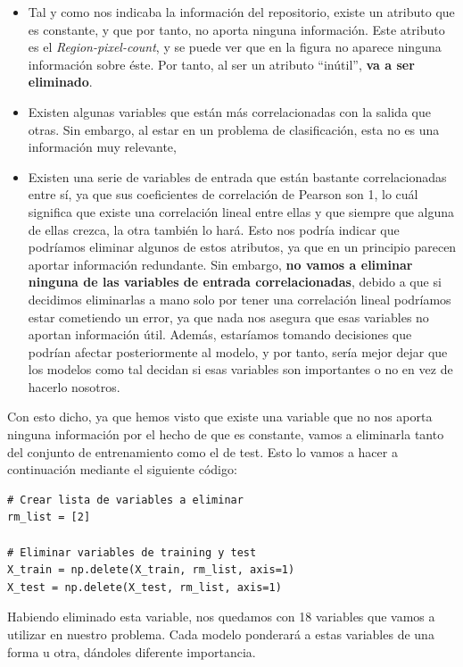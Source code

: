 \documentclass[11pt,a4paper]{article}
\begin{document}
\begin{itemize}[label=\textbullet]
    \item Tal y como nos indicaba la información del repositorio, existe un atributo que es constante, y que por tanto, no aporta
    ninguna información. Este atributo es el \textit{Region-pixel-count}, y se puede ver que en la figura no aparece ninguna
    información sobre éste. Por tanto, al ser un atributo ``inútil'', \textbf{va a ser eliminado}.
    \item Existen algunas variables que están más correlacionadas con la salida que otras. Sin embargo, al estar en un problema
    de clasificación, esta no es una información muy relevante, %
    \item Existen una serie de variables de entrada que están bastante correlacionadas entre sí, ya que sus coeficientes de correlación de
    Pearson son 1, lo cuál significa que existe una correlación lineal entre ellas y que siempre que alguna de ellas crezca, la otra también
    lo hará. Esto nos podría indicar que podríamos eliminar algunos de estos atributos, ya que en un principio parecen aportar información
    redundante. Sin embargo, \textbf{no vamos a eliminar ninguna de las variables de entrada correlacionadas}, debido a que si decidimos
    eliminarlas a mano solo por tener una correlación lineal podríamos estar cometiendo un error, ya que nada nos asegura que esas variables
    no aportan información útil. Además, estaríamos tomando decisiones que podrían afectar posteriormente al modelo, y por tanto, sería
    mejor dejar que los modelos como tal decidan si esas variables son importantes o no en vez de hacerlo nosotros.
\end{itemize}

Con esto dicho, ya que hemos visto que existe una variable que no nos aporta ninguna información por el hecho de que es constante, vamos
a eliminarla tanto del conjunto de entrenamiento como el de test. Esto lo vamos a hacer a continuación mediante el siguiente código:

\begin{lstlisting}
# Crear lista de variables a eliminar
rm_list = [2]

# Eliminar variables de training y test
X_train = np.delete(X_train, rm_list, axis=1)
X_test = np.delete(X_test, rm_list, axis=1)
\end{lstlisting}

Habiendo eliminado esta variable, nos quedamos con 18 variables que vamos a utilizar en nuestro problema. Cada modelo ponderará a estas
variables de una forma u otra, dándoles diferente importancia.
\end{document}
